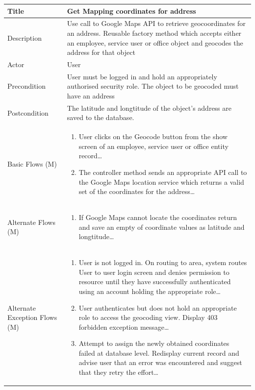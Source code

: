 \documentclass[a4paper,12pt]{article}
\newcommand\addrow[2]{#1 &#2\\ }
\newcommand\addheading[2]{#1 &#2\\ \hline}
\newcommand\tabularhead{\begin{tabular}{lp{11cm}}
\hline
}
\newcommand\addmulrow[2]{ \begin{minipage}[t][][t]{3cm}#1\end{minipage}%
   &\begin{minipage}[t][][t]{11cm}
    \begin{enumerate} #2   \end{enumerate}
    \end{minipage}\\ }
\newenvironment{usecase}{\tabularhead}
{\hline\end{tabular}}
\begin{document}
\begin{samepage}
\begin{usecase}
    \addheading{Title}{Get Mapping coordinates for address}
  \addheading{Description}{Use call to Google Maps API to retrieve geocoordinates for an address. Reusable factory method which accepts either an employee, service user or office object and geocodes the address for that object}
  \addheading{Actor}{User} 
  \addrow{Precondition}{User must be logged in and hold an appropriately authorised security role. The object to be geocoded must have an address}
  \addrow{Postcondition}{The latitude and longtitude of the object's address are saved to the database.}
  \addmulrow{Basic Flows (M)}{\item User clicks on the Geocode button from the show screen of an employee, service user or office entity record\ldots
  \newpage
  \item The controller method sends an appropriate API call to the Google Maps location service which returns a valid set of the coordinates for the address\ldots}
  \addmulrow{Alternate  Flows (M)}{\item If Google Maps cannot locate the coordinates return and save an empty of coordinate values as latitude and longtitude\ldots}
  \addmulrow{Alternate Exception Flows (M)}{\item User is not logged in. On routing to area, system routes User to user login screen and denies permission to resource until they have successfully authenticated using an account holding the appropriate role\ldots
                                                                      \item User authenticates but does not hold an appropriate role to access the geocoding  view. Display 403 forbidden exception message\ldots
                                                                      \item Attempt to assign the newly obtained coordinates failed at database level. Redisplay current record and advise user that an error was encountered and suggest that they retry the effort\ldots}
\end{usecase}


\end{samepage}
\end{document}
